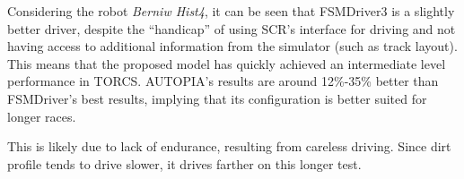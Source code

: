 Considering the robot \emph{Berniw Hist4}, it can be seen that FSMDriver3 is a slightly better driver, despite the ``handicap'' of using SCR's interface for driving and not having access to additional information from the simulator (such as track layout). This means that the proposed model has quickly achieved an intermediate level performance in TORCS. AUTOPIA's results are around 12\%-35\% better than FSMDriver's best results, implying that its configuration is better suited for longer races.

This is likely due to lack of endurance, resulting from careless driving. Since dirt profile tends to drive slower, it drives farther on this longer test.








